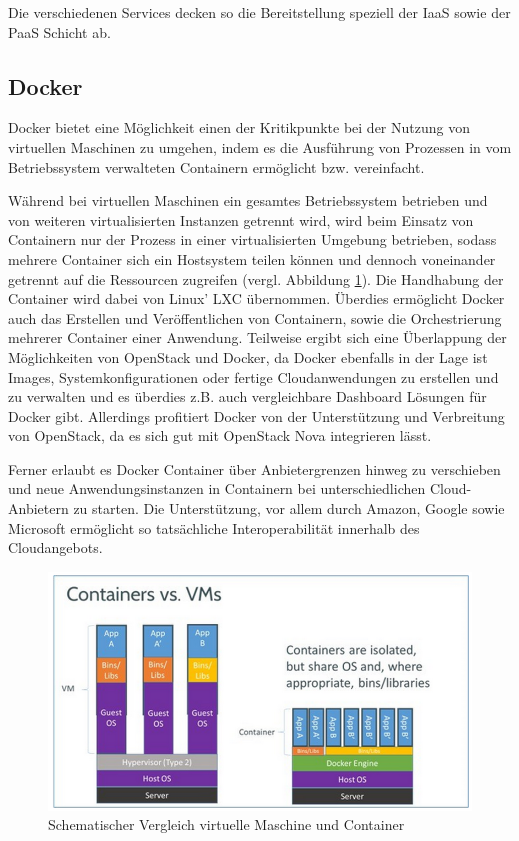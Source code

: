 Die verschiedenen Services decken so die Bereitstellung speziell der IaaS sowie der PaaS Schicht ab. \cite{openStack}

\subsection{Docker}
Docker bietet eine Möglichkeit einen der Kritikpunkte bei der Nutzung von virtuellen Maschinen zu umgehen, indem es die Ausführung von Prozessen in vom Betriebssystem verwalteten Containern ermöglicht bzw. vereinfacht.

Während bei virtuellen Maschinen ein gesamtes Betriebssystem betrieben und von weiteren virtualisierten Instanzen getrennt wird, wird beim Einsatz von Containern nur der Prozess in einer virtualisierten Umgebung betrieben, sodass mehrere Container sich ein Hostsystem teilen können und dennoch voneinander getrennt auf die Ressourcen zugreifen (vergl. Abbildung \ref{fig:docker}). Die Handhabung der Container wird dabei von Linux' LXC übernommen. Überdies ermöglicht Docker auch das Erstellen und Veröffentlichen von Containern, sowie die Orchestrierung mehrerer Container einer Anwendung. Teilweise ergibt sich eine Überlappung der Möglichkeiten von OpenStack und Docker, da Docker ebenfalls in der Lage ist Images, Systemkonfigurationen oder fertige Cloudanwendungen zu erstellen und zu verwalten und es überdies z.B. auch vergleichbare Dashboard Lösungen für Docker gibt. Allerdings profitiert Docker von der Unterstützung und Verbreitung von OpenStack, da es sich gut mit OpenStack Nova integrieren lässt. \cite{dockerZdnet}

Ferner erlaubt es Docker Container über Anbietergrenzen hinweg zu verschieben und neue Anwendungsinstanzen in Containern bei unterschiedlichen Cloud-Anbietern zu starten. Die Unterstützung, vor allem durch Amazon, Google sowie Microsoft ermöglicht so tatsächliche Interoperabilität innerhalb des Cloudangebots.

\begin{figure}
	\centering
	\includegraphics[width=0.8\linewidth]{images/docker-vm-container}
	\caption{Schematischer Vergleich virtuelle Maschine und Container}
	\label{fig:docker}
\end{figure}

